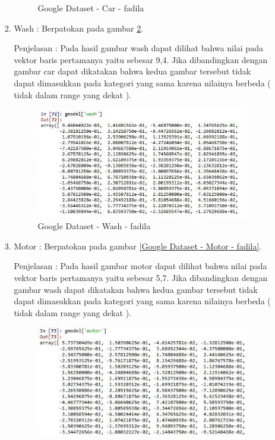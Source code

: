 \begin{enumerate}
\begin{enumerate}
\begin{enumerate}
\begin{figure}[!hbtp]
\caption{Google Dataset - Car - fadila}
\label{Google Dataset - Car - fadila}
\end{figure}
\par
\item Wash :  Berpatokan pada gambar \ref{Google Dataset - Wash - fadila}.
\par Penjelasan : Pada hasil gambar wash dapat dilihat bahwa nilai pada vektor baris pertamanya yaitu sebesar 9,4. Jika dibandingkan dengan gambar car dapat dikatakan bahwa kedua gambar tersebut tidak dapat dimasukkan pada kategori yang sama karena nilainya berbeda ( tidak dalam range yang dekat ).
\par
\begin{figure}[!hbtp]
\centering
\includegraphics[scale=0.3]{figures/1-wash-fadila.jpg}
\caption{Google Dataset - Wash - fadila}
\label{Google Dataset - Wash - fadila}
\end{figure}
\par
\item Motor :  Berpatokan pada gambar \ref{Google Dataset - Motor - fadila}.
\par Penjelasan : Pada hasil gambar motor dapat dilihat bahwa nilai pada vektor baris pertamanya yaitu sebesar 5,7. Jika dibandingkan dengan gambar wash dapat dikatakan bahwa kedua gambar tersebut tidak dapat dimasukkan pada kategori yang sama karena nilainya berbeda ( tidak dalam range yang dekat ).
\par
\begin{figure}[!hbtp]
\centering
\includegraphics[scale=0.3]{figures/1-motor-fadila.jpg}

\end{figure}
\end{enumerate}
\end{enumerate}
\end{enumerate}
